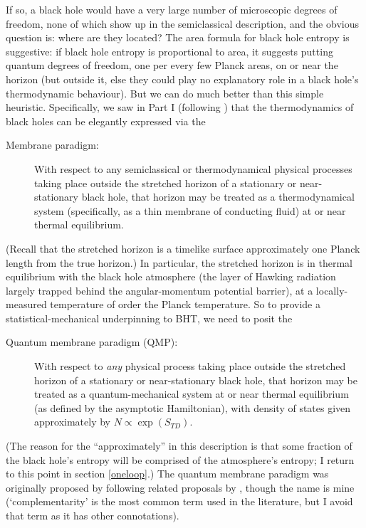 \documentclass[12pt]{article}
\begin{document}
If so, a black hole would have a very large number of microscopic degrees of freedom, none of which show up in the semiclassical description, and the obvious question is: where are they located? The area formula for black hole entropy is suggestive: if black hole entropy is proportional to area, it suggests putting quantum degrees of freedom, one per every few Planck areas, on or near the horizon (but outside it, else they could play no explanatory role in a black hole's thermodynamic behaviour). But we can do much better than this simple heuristic. Specifically, we saw in Part I (following ) that 
the thermodynamics of black holes can be elegantly expressed via the
\begin{description}
\item[Membrane paradigm:] With respect to any semiclassical or thermodynamical physical processes taking place outside the stretched horizon of a stationary or near-stationary black hole, that horizon may be treated as a thermodynamical system (specifically, as a thin membrane of conducting fluid) at or near thermal equilibrium.
\end{description}
(Recall that the stretched horizon is a timelike surface approximately one Planck length from the true horizon.) In particular, the stretched horizon is in thermal equilibrium with the black hole atmosphere (the layer of Hawking radiation largely trapped behind the angular-momentum potential barrier), at a locally-measured temperature of order the Planck temperature. So to provide a statistical-mechanical underpinning to BHT, we need to posit the
\begin{description}
\item[Quantum membrane paradigm (QMP):] With respect to \emph{any} physical process taking place outside the stretched horizon of a stationary or near-stationary black hole, that horizon may be treated as a quantum-mechanical system at or near thermal equilibrium (as defined by the asymptotic Hamiltonian), with density of states given approximately by $N \propto \exp(S_{TD})$.
\end{description}
(The reason for the ``approximately'' in this description is that some fraction of the black hole's entropy will be comprised of the atmosphere's entropy; I return to this point in section \ref{oneloop}.) The quantum membrane paradigm was originally proposed by   following related proposals by , though the name is mine (`complementarity' is the most common term used in the literature, but I avoid that term as it has other connotations). 
\end{document}

